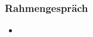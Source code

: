 \documentclass[emulatestandardclasses]{scrartcl}
\begin{document}
\subsubsection{Rahmengespräch}

\begin{itemize}
  \item 
\end{itemize}

\subsubsection{}

\newpage
%


\end{document}
